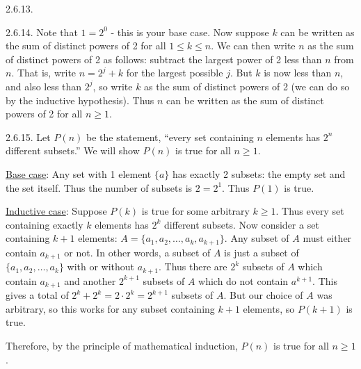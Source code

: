 \begin {itemize}
\begin{ans}{2.6.13.}
	
\end{ans}
\begin{ans}{2.6.14.}
		Note that $1 = 2^0$ - this is your base case.  Now suppose $k$ can be written as the sum of distinct powers of 2 for all $1\le k \le n$.  We can then write $n$ as the sum of distinct powers of 2 as follows: subtract the largest power of 2 less than $n$ from $n$.  That is, write $n = 2^j + k$ for the largest possible $j$.  But $k$ is now less than $n$, and also less than $2^j$, so write $k$ as the sum of distinct powers of 2 (we can do so by the inductive hypothesis).  Thus $n$ can be written as the sum of distinct powers of 2 for all $n \ge 1$.
	
\end{ans}
\begin{ans}{2.6.15.}
		Let $P(n)$ be the statement, ``every set containing $n$ elements has $2^n$ different subsets.''  We will show $P(n)$ is true for all $n \ge 1$.

		\underline{Base case}: Any set with 1 element $\{a\}$ has exactly 2 subsets: the empty set and the set itself.  Thus the number of subsets is $2= 2^1$.  Thus $P(1)$ is true.

		\underline{Inductive case}: Suppose $P(k)$ is true for some arbitrary $k \ge 1$.  Thus every set containing exactly $k$ elements has $2^k$ different subsets.  Now consider a set containing $k+1$ elements: $A = \{a_1, a_2, \ldots, a_k, a_{k+1}\}$.  Any subset of $A$ must either contain $a_{k+1}$ or not.  In other words, a subset of $A$ is just a subset of $\{a_1, a_2,\ldots, a_k\}$ with or without $a_{k+1}$.  Thus there are $2^k$ subsets of $A$ which contain $a_{k+1}$ and another $2^{k+1}$ subsets of $A$ which do not contain $a^{k+1}$.  This gives a total of $2^k + 2^k = 2\cdot 2^k = 2^{k+1}$ subsets of $A$.  But our choice of $A$ was arbitrary, so this works for any subset containing $k+1$ elements, so $P(k+1)$ is true.

		Therefore, by the principle of mathematical induction, $P(n)$ is true for all $n \ge 1$.
	
\end{ans}
\protect \end {itemize}
